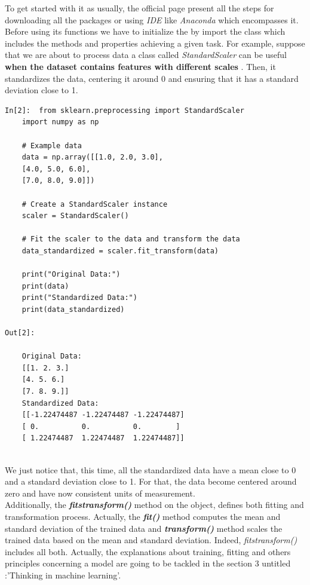 \documentclass[12pt,a4paper, oneside]{book}
\begin{document}
To get started with it as usually, the official page present all the steps for downloading all the packages or using \textit{IDE} like \textit{Anaconda} which encompasses it. \newline
Before using its functions we have to initialize the by import the class which includes the methods and properties achieving a given task. For example, suppose that we are about to process data a class called \textit{StandardScaler} can be useful \textbf{when the dataset contains features with different scales} . Then, it standardizes the data, centering it around 0 and ensuring that it has a standard deviation close to 1.
\begin{lstlisting}[style=stylejupyter]
In[2]:  from sklearn.preprocessing import StandardScaler
	import numpy as np
	
	# Example data
	data = np.array([[1.0, 2.0, 3.0],
	[4.0, 5.0, 6.0],
	[7.0, 8.0, 9.0]])
	
	# Create a StandardScaler instance
	scaler = StandardScaler()
	
	# Fit the scaler to the data and transform the data
	data_standardized = scaler.fit_transform(data)
	
	print("Original Data:")
	print(data)
	print("Standardized Data:")
	print(data_standardized)  
	
Out[2]:
	
	Original Data:
	[[1. 2. 3.]
	[4. 5. 6.]
	[7. 8. 9.]]
	Standardized Data:
	[[-1.22474487 -1.22474487 -1.22474487]
	[ 0.          0.          0.        ]
	[ 1.22474487  1.22474487  1.22474487]]
	
\end{lstlisting}
  We just notice that, this time, all the standardized data have a mean close to 0 and a standard deviation close to 1. For that, the data become centered around zero and have now consistent units of measurement. \\
  
  Additionally, the \textit{\textbf{fitstransform()}} method on the object, defines both fitting and transformation process. Actually, the \textit{\textbf{fit()}} method computes the mean and standard deviation of the trained data and \textit{\textbf{transform()}} method scales the trained data based on the mean and standard deviation. Indeed,  \textit{fitstransform()} includes all both. \newline Actually, the explanations about training, fitting and others principles concerning a model are going to be tackled in the section 3 untitled :'Thinking in machine learning'.
  
\end{document}
